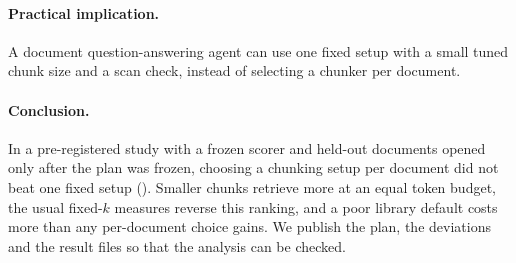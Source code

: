 \paragraph{Practical implication.} A document question-answering agent
can use one fixed setup with a small tuned chunk size and a scan check,
instead of selecting a chunker per document.

\paragraph{Conclusion.} In a pre-registered study with a frozen scorer
and held-out documents opened only after the plan was frozen, choosing a
chunking setup per document did not beat one fixed setup
(\RQoneDecision{}). Smaller chunks retrieve more at an equal token
budget, the usual fixed-$k$ measures reverse this ranking, and a poor
library default costs more than any per-document choice gains. We
publish the plan, the deviations and the result files so that the
analysis can be checked.
